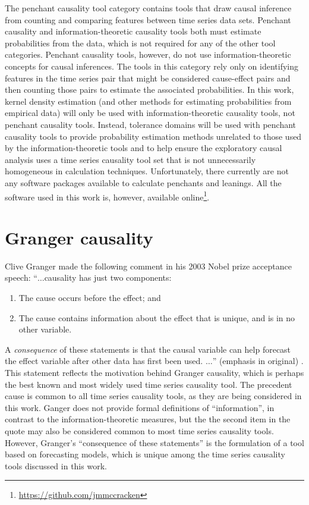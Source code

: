 The penchant causality tool category contains tools that draw causal inference from counting  and comparing features between time series data sets.  Penchant causality and information-theoretic causality tools both must estimate probabilities from the data, which is not required for any of the other tool categories.  Penchant causality tools, however, do not use information-theoretic concepts for causal inferences.  The tools in this category rely only on identifying features in the time series pair that might be considered cause-effect pairs and then counting those pairs to estimate the associated probabilities.  In this work, kernel density estimation \cite{Kaiser2002} (and other methods for estimating probabilities from empirical data) will only be used with information-theoretic causality tools, not penchant causality tools.  Instead, tolerance domains will be used with penchant causality tools to provide probability estimation methods unrelated to those used by the information-theoretic tools and to help ensure the exploratory causal analysis uses a time series causality tool set that is not unnecessarily homogeneous in calculation techniques.  Unfortunately, there currently are not any software packages available to calculate penchants and leanings.  All the software used in this work is, however, available online\footnote{\url{https://github.com/jmmccracken}}.

\section{Granger causality}
\label{sec:GC}
Clive Granger made the following comment in his 2003 Nobel prize acceptance speech:
``$\ldots$causality has just two components:
\begin{enumerate}
\item The cause occurs before the effect; and
\item The cause contains information about the effect that is unique, and is in no other variable.
\end{enumerate}
A {\em consequence} of these statements is that the causal variable can help forecast the effect variable after other data has first been used. $\ldots$'' (emphasis in original) \cite{Granger2003}.  This statement reflects the motivation behind Granger causality, which is perhaps the best known and most widely used time series causality tool.  The precedent cause is common to all time series causality tools, as they are being considered in this work.  Ganger does not provide formal definitions of ``information'', in contrast to the information-theoretic measures, but the the second item in the quote may also be considered common to most time series causality tools.  However, Granger's ``consequence of these statements'' is the formulation of a tool based on forecasting models, which is unique among the time series causality tools discussed in this work.  

